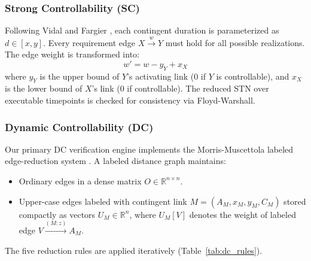 \documentclass[conference]{IEEEtran}
\begin{document}
\subsubsection{Strong Controllability (SC)}
Following Vidal and Fargier \cite{vidal1999}, each contingent duration is parameterized as $d \in [x, y]$. Every requirement edge $X \xrightarrow{w} Y$ must hold for all possible realizations. The edge weight is transformed into:
\begin{equation}
w' = w - y_Y + x_X
\end{equation}
where $y_Y$ is the upper bound of $Y$'s activating link (0 if $Y$ is controllable), and $x_X$ is the lower bound of $X$'s link (0 if controllable). The reduced STN over executable timepoints is checked for consistency via Floyd-Warshall.

\subsubsection{Dynamic Controllability (DC)}
Our primary DC verification engine implements the Morris-Muscettola labeled edge-reduction system \cite{morris2005}. A labeled distance graph maintains:
\begin{itemize}
    \item Ordinary edges in a dense matrix $O \in \mathbb{R}^{n \times n}$.
    \item Upper-case edges labeled with contingent link $M = (A_M, x_M, y_M, C_M)$ stored compactly as vectors $U_M \in \mathbb{R}^n$, where $U_M[V]$ denotes the weight of labeled edge $V \xrightarrow{(M: z)} A_M$.
\end{itemize}

The five reduction rules are applied iteratively (Table~\ref{tab:dc_rules}).

\begin{table}[h]
\centering
\caption{Morris-Muscettola DC Reduction Rules \cite{morris2005}}
\label{tab:dc_rules}
\end{table}
\end{document}
